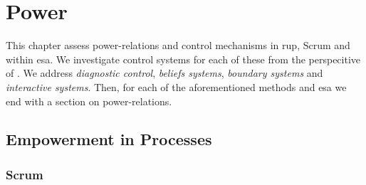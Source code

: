 \chapter{Power}
This chapter assess power-relations and control mechanisms in \ac{rup}, Scrum and within \ac{esa}. We investigate control systems for each of these from the perspecitive of \citep{simons1995control}. We address \textit{diagnostic control}, \textit{beliefs systems}, \textit{boundary systems} and \textit{interactive systems}. Then, for each of the aforementioned methods and \ac{esa} we end with a section on power-relations.

\section{Empowerment in Processes}

\subsection{Scrum}


